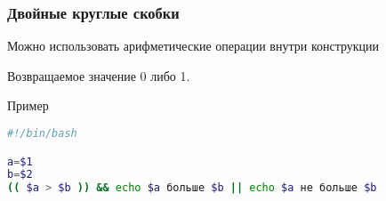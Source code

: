 \begin{frame}[fragile]
	\frametitle{Двойные круглые скобки}

	Можно использовать арифметические операции внутри конструкции\\

	Возвращаемое значение 0 либо 1.

	\begin{block}{Пример}
		\begin{lstlisting}[language=bash]
#!/bin/bash

a=$1
b=$2
(( $a > $b )) && echo $a больше $b || echo $a не больше $b
		\end{lstlisting}
	\end{block}
\end{frame}
